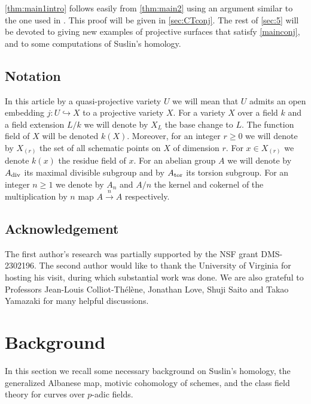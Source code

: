 \documentclass[12pt]{amsart}
\theoremstyle{remark}
\renewcommand{\1}{{\mathbb{S}}}
\newcommand{\<}{\langle}
\renewcommand{\>}{\rangle}
\newcommand{\tor}{{\rm tor}}
\newcommand{\dv}{{\rm div}}
\begin{document}
\autoref{thm:main1intro} follows easily from \autoref{thm:main2} using an argument similar to the one used in \cite[Theorem 1.2]{GL24}. This proof will be given in \autoref{sec:CTconj}. The rest of \autoref{sec:5} will be devoted to giving new examples of projective surfaces that satisfy \autoref{mainconj}, and to some computations of Suslin's homology. 
 


	














	
	
\subsection*{Notation} In this article by a quasi-projective variety $U$ we will mean that $U$ admits an open embedding $j:U\hookrightarrow X$ to a projective variety $X$. For a variety $X$ over a field $k$ and a field extension $L/k$ we will denote by $X_L$ the base change to $L$. The function field of $X$ will be denoted $k(X)$. Moreover, for an integer $r\geq 0$ we will denote by $X_{(r)}$ the set of all schematic points on $X$ of dimension $r$. For $x\in X_{(r)}$ we denote $k(x)$ the residue field of $x$. For an abelian group $A$ we will denote by $A_{\dv}$ its maximal divisible subgroup  and by $A_{\tor}$ its torsion subgroup.  For an integer $n\geq 1$ we denote by $A_n$ and $A/n$ the kernel and cokernel of the multiplication by $n$ map $A\xrightarrow{n}A$ respectively. 

\subsection*{Acknowledgement} The first author's research was partially supported by the  NSF grant DMS-2302196.  The second author would like to thank the University
of Virginia for hosting his visit, during which substantial work was done. We are also grateful to Professors Jean-Louis Colliot-Th\'{e}l\`{e}ne, Jonathan Love, Shuji Saito and Takao Yamazaki  for many helpful discussions. 
	
\vspace{3pt}
	
\section{Background}\label{sec:background}
 In this section we recall some necessary background on Suslin's homology, the generalized Albanese map, motivic cohomology of schemes, and the class field theory for curves over $p$-adic fields.  
\end{document}
